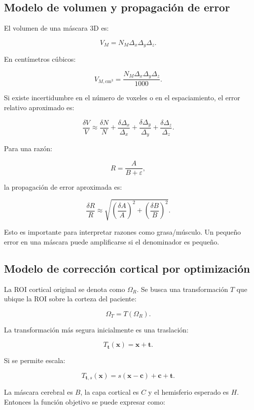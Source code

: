 \documentclass[12pt,a4paper]{article}
\begin{document}
\subsection{Modelo de volumen y propagación de error}

El volumen de una máscara 3D es:

\[
V_M =
N_M\Delta_x\Delta_y\Delta_z.
\]

En centímetros cúbicos:

\[
V_{M,\text{cm}^3}
=
\frac{N_M\Delta_x\Delta_y\Delta_z}{1000}.
\]

Si existe incertidumbre en el número de voxeles o en el espaciamiento, el error relativo aproximado es:

\[
\frac{\delta V}{V}
\approx
\frac{\delta N}{N}
+
\frac{\delta \Delta_x}{\Delta_x}
+
\frac{\delta \Delta_y}{\Delta_y}
+
\frac{\delta \Delta_z}{\Delta_z}.
\]

Para una razón:

\[
R =
\frac{A}{B+\varepsilon},
\]

la propagación de error aproximada es:

\[
\frac{\delta R}{R}
\approx
\sqrt{
\left(\frac{\delta A}{A}\right)^2
+
\left(\frac{\delta B}{B}\right)^2
}.
\]

Esto es importante para interpretar razones como grasa/músculo. Un pequeño error en una máscara puede amplificarse si el denominador es pequeño.

\subsection{Modelo de corrección cortical por optimización}

La ROI cortical original se denota como \(\Omega_R\). Se busca una transformación \(T\) que ubique la ROI sobre la corteza del paciente:

\[
\Omega_T = T(\Omega_R).
\]

La transformación más segura inicialmente es una traslación:

\[
T_{\mathbf{t}}(\mathbf{x})=
\mathbf{x}+\mathbf{t}.
\]

Si se permite escala:

\[
T_{\mathbf{t},s}(\mathbf{x})
=
s(\mathbf{x}-\mathbf{c})
+
\mathbf{c}
+
\mathbf{t}.
\]

La máscara cerebral es \(B\), la capa cortical es \(C\) y el hemisferio esperado es \(H\). Entonces la función objetivo se puede expresar como:
\end{document}
